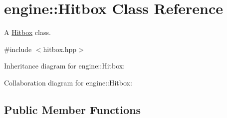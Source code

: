 \hypertarget{classengine_1_1_hitbox}{}\section{engine\+:\+:Hitbox Class Reference}
\label{classengine_1_1_hitbox}


A \hyperlink{classengine_1_1_hitbox}{Hitbox} class.  




{\ttfamily \#include $<$hitbox.\+hpp$>$}



Inheritance diagram for engine\+:\+:Hitbox\+:


Collaboration diagram for engine\+:\+:Hitbox\+:
\subsection*{Public Member Functions}
